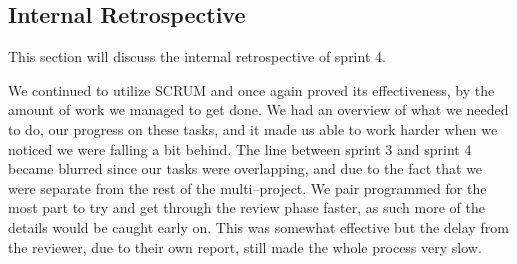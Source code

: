 \subsection{Internal Retrospective}
This section will discuss the internal retrospective of sprint 4.

We continued to utilize SCRUM and once again proved its effectiveness, by the amount of work we managed to get done.
We had an overview of what we needed to do, our progress on these tasks, and it made us able to work harder when we noticed we were falling a bit behind.
The line between sprint 3 and sprint 4 became blurred since our tasks were overlapping, and due to the fact that  we were separate from the rest of the multi--project.
We pair programmed for the most part to try and get through the review phase faster, as such more of the details would be caught early on.
This was somewhat effective but the delay from the reviewer, due to their own report, still made the whole process very slow.
